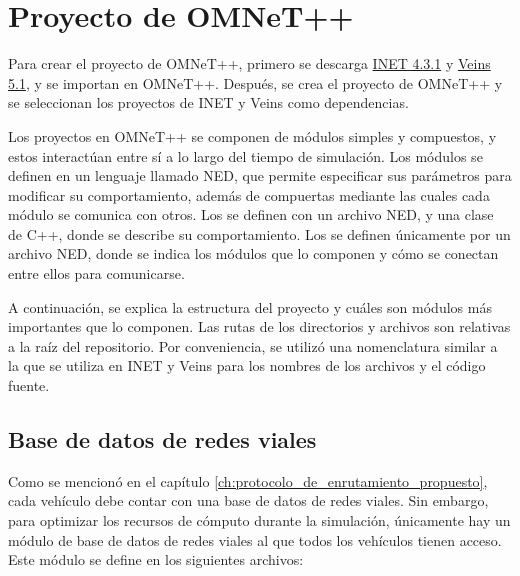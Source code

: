 \section{Proyecto de OMNeT++}
\label{sec:proyecto_omnet}

Para crear el proyecto de OMNeT++, primero se descarga
\href{https://inet.omnetpp.org/Download.html}{INET 4.3.1} y
\href{https://veins.car2x.org/download/}{Veins 5.1}, y se importan en OMNeT++.
Después, se crea el proyecto de OMNeT++ y se seleccionan los proyectos de INET y
Veins como dependencias.

Los proyectos en OMNeT++ se componen de módulos simples y compuestos, y estos
interactúan entre sí a lo largo del tiempo de simulación. Los módulos se definen
en un lenguaje llamado NED, que permite especificar sus parámetros para
modificar su comportamiento, además de compuertas mediante las cuales cada
módulo se comunica con otros. Los  se definen con un
archivo NED, y una clase de C++, donde se describe su comportamiento. Los
 se definen únicamente por un archivo NED, donde se
indica los módulos que lo componen y cómo se conectan entre ellos para
comunicarse.

A continuación, se explica la estructura del proyecto y cuáles son módulos más
importantes que lo componen. Las rutas de los directorios y archivos son
relativas a la raíz del repositorio. Por conveniencia, se utilizó una
nomenclatura similar a la que se utiliza en INET y Veins para los nombres de
los archivos y el código fuente.

\subsection{Base de datos de redes viales}
\label{subsec:base_de_datos_de_redes_viales}

Como se mencionó en el capítulo \ref{ch:protocolo_de_enrutamiento_propuesto},
cada vehículo debe contar con una base de datos de redes viales. Sin embargo,
para optimizar los recursos de cómputo durante la simulación, únicamente hay un
módulo de base de datos de redes viales al que todos los vehículos tienen
acceso. Este módulo se define en los siguientes archivos:

